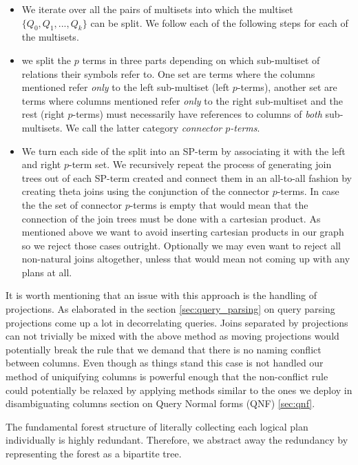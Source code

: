 \begin{itemize}
\item We iterate over all the pairs of multisets into which the multiset
  \(\{Q_0,Q_1,...,Q_k\}\) can be split. We follow each of the
  following steps for each of the multisets.
\item we split the \(p\) terms in three parts depending on which
  sub-multiset of relations their symbols refer to. One set are terms
  where the columns mentioned refer \emph{only} to the left sub-multiset
  (left \(p\)-terms), another set are terms where columns mentioned
  refer \emph{only} to the right sub-multiset and the rest (right
  \(p\)-terms) must necessarily have references to columns of \emph{both}
  sub-multisets. We call the latter category \emph{connector \(p\)-terms}.
\item We turn each side of the split into an SP-term by associating it
  with the left and right \(p\)-term set. We recursively repeat the
  process of generating join trees out of each SP-term created and
  connect them in an all-to-all fashion by creating theta joins using
  the conjunction of the connector \(p\)-terms. In case the the set of
  connector \(p\)-terms is empty that would mean that the connection
  of the join trees must be done with a cartesian product. As
  mentioned above we want to avoid inserting cartesian products in our
  graph so we reject those cases outright. Optionally we may even want
  to reject all non-natural joins altogether, unless that would mean
  not coming up with any plans at all.
\end{itemize}


It is worth mentioning that an issue with this approach is the
handling of projections. As elaborated in the section
\ref{sec:query_parsing} on query parsing projections come up a lot in
decorrelating queries. Joins separated by projections can not
trivially be mixed with the above method as moving projections would
potentially break the rule that we demand that there is no naming
conflict between columns. Even though as things stand this case is not
handled our method of uniquifying columns is powerful enough that the
non-conflict rule could potentially be relaxed by applying methods
similar to the ones we deploy in disambiguating columns section on
Query Normal forms (QNF) \ref{sec:qnf}.

The fundamental forest structure of literally collecting each logical
plan individually is highly redundant. Therefore, we abstract away the
redundancy by representing the forest as a bipartite tree.

